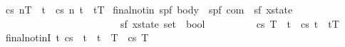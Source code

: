 \begin{isabellebody}
{\isachardoublequoteopen}{\isasymGamma}{\isasymturnstile}\ {\isasymlangle}c{\isacharcomma}s{\isasymrangle}\ {\isacharequal}n{\isasymRightarrow}{\isasymnotin}T\ {\isacharequal}\ {\isacharparenleft}{\isasymforall}t{\isachardot}\ {\isasymGamma}{\isasymturnstile}\ {\isasymlangle}c{\isacharcomma}s{\isasymrangle}\ {\isacharequal}n{\isasymRightarrow}\ t\ {\isasymlongrightarrow}\ t{\isasymnotin}T{\isacharparenright}{\isachardoublequoteclose}\isanewline
\isanewline
{}\isamarkupfalse%
\ final{\isacharunderscore}notin{\isacharcolon}{\isacharcolon}\ {\isachardoublequoteopen}{\isacharparenleft}{\isacharprime}s{\isacharcomma}{\isacharprime}p{\isacharcomma}{\isacharprime}f{\isacharparenright}\ body\ {\isasymRightarrow}\ {\isacharparenleft}{\isacharprime}s{\isacharcomma}{\isacharprime}p{\isacharcomma}{\isacharprime}f{\isacharparenright}\ com\ {\isasymRightarrow}\ {\isacharparenleft}{\isacharprime}s{\isacharcomma}{\isacharprime}f{\isacharparenright}\ xstate\ \ \isanewline
\ \ \ \ \ \ \ \ \ \ \ \ \ \ \ \ \ \ \ \ \ \ \ {\isasymRightarrow}\ {\isacharparenleft}{\isacharprime}s{\isacharcomma}{\isacharprime}f{\isacharparenright}\ xstate\ set\ {\isasymRightarrow}\ bool{\isachardoublequoteclose}\isanewline
\ \ {\isacharparenleft}{\isachardoublequoteopen}{\isacharunderscore}{\isasymturnstile}\ {\isasymlangle}{\isacharunderscore}{\isacharcomma}{\isacharunderscore}{\isasymrangle}\ {\isasymRightarrow}{\isasymnotin}{\isacharunderscore}{\isachardoublequoteclose}\ \ {\isacharbrackleft}{}{}{\isacharcomma}{}{}{\isacharcomma}{}{}{\isacharcomma}{}{}{\isacharbrackright}\ {}{}{\isacharparenright}\ \isanewline
{\isachardoublequoteopen}{\isasymGamma}{\isasymturnstile}\ {\isasymlangle}c{\isacharcomma}s{\isasymrangle}\ {\isasymRightarrow}{\isasymnotin}T\ {\isacharequal}\ {\isacharparenleft}{\isasymforall}t{\isachardot}\ {\isasymGamma}{\isasymturnstile}\ {\isasymlangle}c{\isacharcomma}s{\isasymrangle}\ {\isasymRightarrow}t\ {\isasymlongrightarrow}\ t{\isasymnotin}T{\isacharparenright}{\isachardoublequoteclose}\isanewline
\isanewline
{}\isamarkupfalse%
\ final{\isacharunderscore}notinI{\isacharcolon}\ {\isachardoublequoteopen}{\isasymlbrakk}{\isasymAnd}t{\isachardot}\ {\isasymGamma}{\isasymturnstile}{\isasymlangle}c{\isacharcomma}s{\isasymrangle}\ {\isasymRightarrow}\ t\ {\isasymLongrightarrow}\ t\ {\isasymnotin}\ T{\isasymrbrakk}\ {\isasymLongrightarrow}\ {\isasymGamma}{\isasymturnstile}{\isasymlangle}c{\isacharcomma}s{\isasymrangle}\ {\isasymRightarrow}{\isasymnotin}T{\isachardoublequoteclose}\isanewline

\end{isabellebody}
